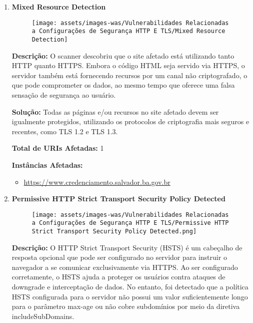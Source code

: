 \documentclass[a4paper,12pt]{article}
\begin{document}
\begin{enumerate}
\item \textbf{Mixed Resource Detection}

                        \begin{figure}[h!]
                        \centering
                        \texttt{[image: assets/images-was/Vulnerabilidades Relacionadas a Configurações de Segurança HTTP E TLS/Mixed Resource Detection]}
                        \end{figure}
                        \FloatBarrier
                        \textbf{Descrição:} O scanner descobriu que o site afetado está utilizando tanto HTTP quanto HTTPS. Embora o código HTML seja servido via HTTPS, o servidor também está fornecendo recursos por um canal não criptografado, o que pode comprometer os dados, ao mesmo tempo que oferece uma falsa sensação de segurança ao usuário.


\textbf{Solução:} Todas as páginas e/ou recursos no site afetado devem ser igualmente protegidos, utilizando os protocolos de criptografia mais seguros e recentes, como TLS 1.2 e TLS 1.3.

\textbf{Total de URIs Afetadas:} 1

\textbf{Instâncias Afetadas:}
\begin{itemize}
    \item \url{https://www.credenciamento.salvador.ba.gov.br}
\end{itemize}

\item \textbf{Permissive HTTP Strict Transport Security Policy Detected}

                        \begin{figure}[h!]
                        \centering
                        \texttt{[image: assets/images-was/Vulnerabilidades Relacionadas a Configurações de Segurança HTTP E TLS/Permissive HTTP Strict Transport Security Policy Detected.png]}
                        \end{figure}
                        \FloatBarrier
                        \textbf{Descrição:} O HTTP Strict Transport Security (HSTS) é um cabeçalho de resposta opcional que pode ser configurado no servidor para instruir o navegador a se comunicar exclusivamente via HTTPS. Ao ser configurado corretamente, o HSTS ajuda a proteger os usuários contra ataques de downgrade e interceptação de dados. No entanto, foi detectado que a política HSTS configurada para o servidor não possui um valor suficientemente longo para o parâmetro max-age ou não cobre subdomínios por meio da diretiva includeSubDomains.


\end{enumerate}
\end{document}
